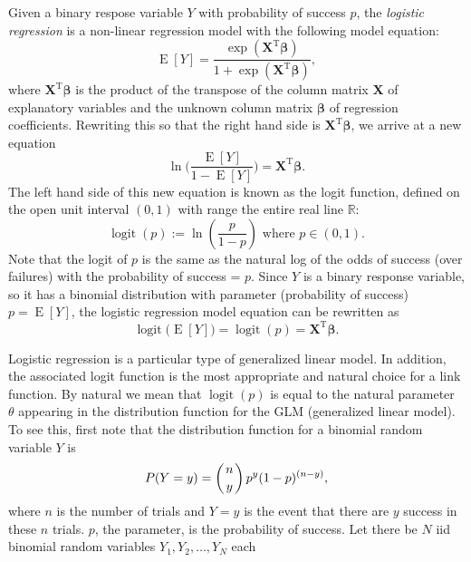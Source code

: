 \documentclass[12pt]{article}
\begin{document}

Given a binary respose variable $Y$ with probability of success $p$, the \emph{logistic regression} is a non-linear 
regression model with the following model equation: 
$$\operatorname{E}[Y]=\frac{\operatorname{exp}(\boldsymbol{X}^{\operatorname{T}}\boldsymbol{\beta})}
{1+\operatorname{exp}(\boldsymbol{X}^{\operatorname{T}}\boldsymbol{\beta})},$$
where $\boldsymbol{X}^{\operatorname{T}}\boldsymbol{\beta}$ is the product of the transpose of the column matrix 
$\boldsymbol{X}$ of explanatory variables and the unknown column matrix $\boldsymbol{\beta}$ of regression coefficients.  
Rewriting this so that the right hand side is $\boldsymbol{X}^{\operatorname{T}}\boldsymbol{\beta}$, we arrive at a new 
equation 
$$\ln\Big(\frac{\operatorname{E}[Y]}{1-\operatorname{E}[Y]}\Big)=\boldsymbol{X}^{\operatorname{T}}\boldsymbol{\beta}.$$
The left hand side of this new equation is known as the logit function, defined on the open unit interval $(0,1)$ with 
range the entire real line $\mathbb{R}$:
$$\operatorname{logit}(p):=\ln(\frac{p}{1-p})\mbox{ where }p\in(0,1).$$
Note that the logit of $p$ is the same as the natural log of the odds of success (over failures) with the probability of 
success = $p$.
Since $Y$ is a binary response variable, so it has a binomial distribution with parameter (probability of success) 
$p=\operatorname{E}[Y]$, the logistic regression model equation can be rewritten as
\begin{equation}
\operatorname{logit}\big(\operatorname{E}[Y]\big)=\operatorname{logit}(p)=\boldsymbol{X}^{\operatorname{T}}\boldsymbol{\beta}.
\end{equation}
\par
Logistic regression is a particular type of generalized linear model.  In addition, the associated logit function is 
the most appropriate and natural choice for a link function.  By natural we mean that $\operatorname{logit}(p)$ is equal 
to the natural parameter $\theta$ appearing in the distribution function for the GLM (generalized linear model).  To see 
this, first note that the distribution function for a binomial random variable $Y$ is 
$$P(Y=y)=\left({n\atop y}\right)p^y(1-p)^{(n-y)},$$
where $n$ is the number of trials and $Y=y$ is the event that there are $y$ success in these $n$ trials.  $p$, the 
parameter, is the probability of success.  Let there be $N$ iid binomial random variables $Y_1,Y_2,\ldots,Y_N$ each 
\end{document}
